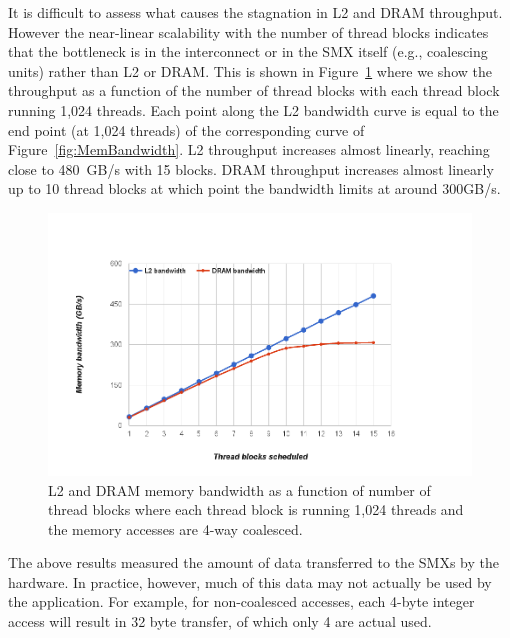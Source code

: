 It is difficult to assess what causes the stagnation in L2 and DRAM throughput.
However the near-linear scalability with the number of thread blocks indicates that the bottleneck
is in the interconnect or in the SMX itself (e.g., coalescing units) rather than L2 or DRAM.
This is shown in Figure~\ref{fig:L2-DRAM-bandwidth} where we show the throughput as a function of
the number of thread blocks with each thread block running 1,024 threads.
Each point along the L2 bandwidth curve is equal to the end point (at 1,024 threads) of the corresponding curve of
Figure~\ref{fig:MemBandwidth}.
L2 throughput increases almost linearly, reaching close to 480~GB/s with 15 blocks. DRAM throughput increases
almost linearly up to 10 thread blocks at which point the bandwidth limits at around 300GB/s.

\begin{figure}
\vspace{-0.8cm}
\center
\includegraphics[scale=0.3]{DRAML2Bandwidth-4wayCoalesced.png}
\caption{\footnotesize\textnormal{L2 and DRAM memory bandwidth as a function of number of thread blocks where each thread
block is running 1,024 threads and the memory accesses are 4-way coalesced.
}}
\label{fig:L2-DRAM-bandwidth}
\vspace{-0.3cm}
\end{figure}

The above results measured the amount of data transferred to the SMXs by the
hardware.
In practice, however, much of this data may not actually be used by the
application.
For example, for non-coalesced accesses, each 4-byte integer access will result in 32
byte transfer, of which only 4 are actual used.

